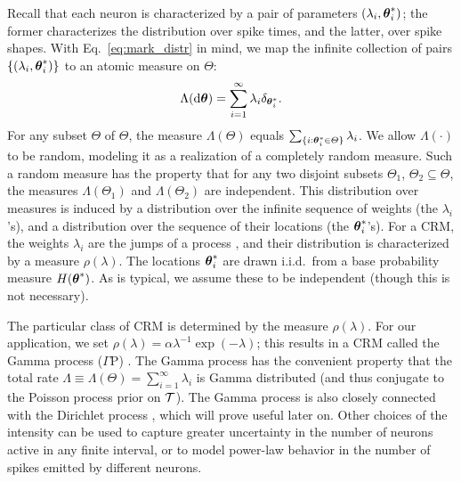 Recall that each neuron is characterized by a pair of parameters $(\lambda_i, \boldsymbol{\theta}^*_i)$; the former characterizes the distribution over spike times, 
and the latter, over spike
shapes. With Eq.~\eqref{eq:mark_distr} in mind, we map the infinite collection of pairs $\{(\lambda_i, \boldsymbol{\theta}^*_i)\}$ to an atomic measure on $\Theta$:
\vspace{-.1in}
\begin{align}
  \Lambda(\mathrm{d} \boldsymbol{\theta}) = \sum_{i=1}^{\infty} \lambda_i \delta_{\boldsymbol{\theta}^*_i}.
\end{align}
For any subset $\varTheta$ of $\Theta$, the measure $\Lambda(\varTheta)$ equals \( \sum_{\{ i: \boldsymbol{\theta}^*_i \in \varTheta \} } \lambda_i\). We allow $\Lambda(\cdot)$ to be random,
modeling it as a realization of a completely random measure. Such a random measure has the property that for any two disjoint subsets $\varTheta_1$,  $\varTheta_2 \subseteq \Theta$, the measures $\Lambda(\varTheta_1)$ and $\Lambda(\varTheta_2)$ are independent. 
This distribution over measures is induced by a distribution
over the infinite sequence of weights (the $\lambda_i$'s), and a distribution over the sequence of their locations (the $\boldsymbol{\theta}^*_i$'s). 
For a CRM, the weights $\lambda_i$ are the jumps of a \Levy process \citep{Sato90}, and their distribution is characterized by a 
\Levy measure $\rho(\lambda)$. The locations $\boldsymbol{\theta}^*_i$ are drawn i.i.d.\  from a base probability measure $H(\boldsymbol{\theta}^*)$.
As is typical, we assume these to be independent (though this is not necessary). 

The particular class of CRM is determined by the \Levy measure $\rho(\lambda)$. For our application, we set $\rho(\lambda) = \alpha \lambda^{-1}\exp(-\lambda)$;
this results in a CRM called the Gamma process ($\Gamma$P) \citep{applebaum2004}. 
The Gamma process has the convenient property that the 
total rate $\Lambda \equiv \Lambda(\Theta) = \sum_{i=1}^{\infty} \lambda_i$ is Gamma distributed (and thus conjugate to the Poisson process prior on $\mathcal{T}$).
The Gamma process is also closely connected with the Dirichlet process \citep{Ferguson73}, which will prove useful
later on.
Other choices of the \Levy intensity can be used to capture greater uncertainty in the number of neurons active in any finite interval, or to model
power-law behavior in the number of spikes emitted by different neurons.

